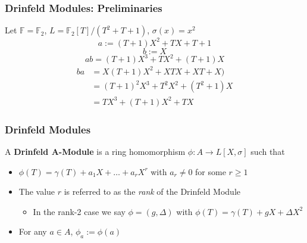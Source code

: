 \documentclass{beamer}
\newcommand{\f}{\mathbb{F}}
\begin{document}
\begin{frame}\frametitle{Drinfeld Modules: Preliminaries}

\begin{example}
Let $\mathbb{F} = \f_2$, $L = \f_2[T]/(T^2 + T + 1)$, $\sigma(x) = x^2$
\[ a:= (T + 1)X^2 + TX + T + 1 \]
\[b := X\]
\[ab = (T + 1)X^3 + TX^2 + (T + 1)X\]
\begin{align*}
    ba & = X(T + 1)X^2 + XTX + XT + X)\\
    & = (T+1)^2X^3 + T^2X^2 + (T^2 + 1)X \\
     & = TX^3 + (T+1)X^2 + TX 
\end{align*}
\end{example}

\end{frame}





\begin{frame}
\frametitle{Drinfeld Modules}

\begin{definition}
A \textbf{Drinfeld A-Module} is a ring homomorphism $\phi: A \to L[X,\sigma]$ such that 

\begin{itemize}
    \item $\phi(T) = \gamma(T) + a_1X + \ldots + a_rX^r$ with $a_r \neq 0$ for some $r \geq 1$
\end{itemize}
\end{definition}

\begin{itemize}
    \item The value $r$ is referred to as the \textit{rank} of the Drinfeld Module
    \begin{itemize}
        \item In the rank-2 case we say $\phi = (g, \Delta)$ with $\phi(T) = \gamma(T) + gX + \Delta X^2$
    \end{itemize}
    \item For any $a \in A$, $\phi_a := \phi(a)$
\end{itemize}

\end{frame}

\end{document}
